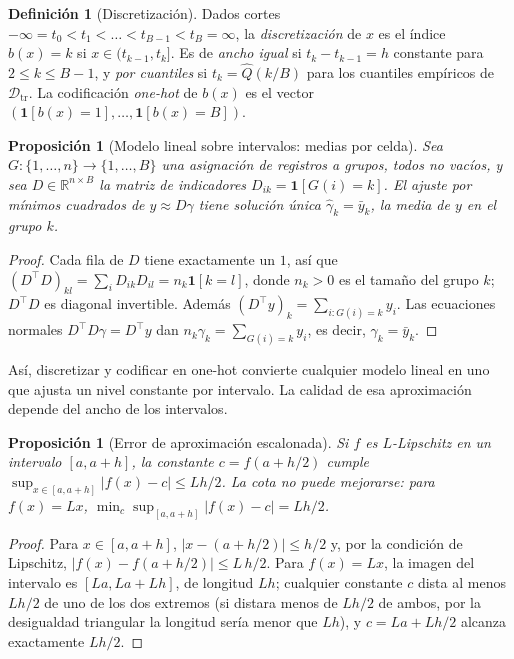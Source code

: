 \documentclass[11pt]{article}
\newtheorem{proposicion}[teorema]{Proposición}
\theoremstyle{definition}
\newtheorem{definicion}[teorema]{Definición}
\theoremstyle{remark}
\newcommand{\R}{\mathbb{R}}
\newcommand{\ind}[1]{\mathbf{1}\!\left[#1\right]}
\newcommand{\abs}[1]{\left\lvert #1\right\rvert}
\newcommand{\Dtr}{\mathcal{D}_{\mathrm{tr}}}
\begin{document}
\begin{definicion}[Discretización]\label{def:binning}
\noindent Dados cortes $-\infty=t_0<t_1<\dots<t_{B-1}<t_B=\infty$, la \emph{discretización} de $x$ es el índice $b(x)=k$ si $x\in(t_{k-1},t_k]$. Es de \emph{ancho igual} si $t_k-t_{k-1}=h$ constante para $2\le k\le B-1$, y \emph{por cuantiles} si $t_k=\hat Q(k/B)$ para los cuantiles empíricos de $\Dtr$. La codificación \emph{one-hot} de $b(x)$ es el vector $(\ind{b(x)=1},\dots,\ind{b(x)=B})$.
\end{definicion}

\begin{proposicion}[Modelo lineal sobre intervalos: medias por celda]\label{prop:celdas}
\noindent Sea $G:\{1,\dots,n\}\to\{1,\dots,B\}$ una asignación de registros a grupos, todos no vacíos, y sea $D\in\R^{n\times B}$ la matriz de indicadores $D_{ik}=\ind{G(i)=k}$. El ajuste por mínimos cuadrados de $y\approx D\gamma$ tiene solución única $\hat\gamma_k=\bar y_k$, la media de $y$ en el grupo $k$.
\end{proposicion}
\begin{proof}
\noindent Cada fila de $D$ tiene exactamente un $1$, así que $(D^\top D)_{kl}=\sum_iD_{ik}D_{il}=n_k\ind{k=l}$, donde $n_k>0$ es el tamaño del grupo $k$; $D^\top D$ es diagonal invertible. Además $(D^\top y)_k=\sum_{i:G(i)=k}y_i$. Las ecuaciones normales $D^\top D\gamma=D^\top y$ dan $n_k\gamma_k=\sum_{G(i)=k}y_i$, es decir, $\gamma_k=\bar y_k$.
\end{proof}

\noindent Así, discretizar y codificar en one-hot convierte cualquier modelo lineal en uno que ajusta un nivel constante por intervalo. La calidad de esa aproximación depende del ancho de los intervalos.

\begin{proposicion}[Error de aproximación escalonada]\label{prop:escalon}
\noindent Si $f$ es $L$-Lipschitz en un intervalo $[a,a+h]$, la constante $c=f(a+h/2)$ cumple $\sup_{x\in[a,a+h]}\abs{f(x)-c}\le Lh/2$. La cota no puede mejorarse: para $f(x)=Lx$, $\min_c\sup_{[a,a+h]}\abs{f(x)-c}=Lh/2$.
\end{proposicion}
\begin{proof}
\noindent Para $x\in[a,a+h]$, $\abs{x-(a+h/2)}\le h/2$ y, por la condición de Lipschitz, $\abs{f(x)-f(a+h/2)}\le L\,h/2$. Para $f(x)=Lx$, la imagen del intervalo es $[La,La+Lh]$, de longitud $Lh$; cualquier constante $c$ dista al menos $Lh/2$ de uno de los dos extremos (si distara menos de $Lh/2$ de ambos, por la desigualdad triangular la longitud sería menor que $Lh$), y $c=La+Lh/2$ alcanza exactamente $Lh/2$.
\end{proof}
\end{document}
